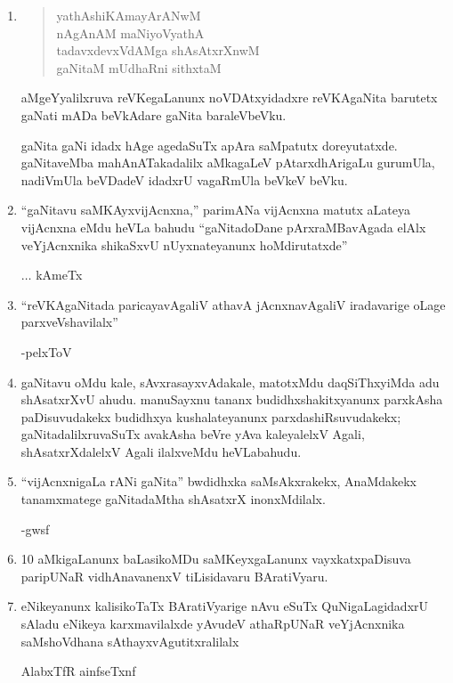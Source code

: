 \begin{enumerate}[\rm 1)]
\item
\begin{center} 
\begin{verse}
yathAshiKAmayArANwM\\
nAgAnAM maNiyoVyathA\\
tadavxdevxVdAMga shAsAtxrXnwM\\
gaNitaM mUdhaRni sithxtaM
\end{verse}
\end{center}
aMgeYyalilxruva reVKegaLanunx noVDAtxyidadxre reVKAgaNita barutetx gaNati mADa beVkAdare gaNita baraleVbeVku.

gaNita gaNi idadx hAge agedaSuTx apAra saMpatutx doreyutatxde. gaNitaveMba mahAnATakadalilx aMkagaLeV pAtarxdhArigaLu gurumUla, nadiVmUla beVDadeV idadxrU vagaRmUla beVkeV beVku.

\item ``gaNitavu saMKAyxvijAcnxna,'' parimANa vijAcnxna matutx aLateya vijAcnxna eMdu heVLa bahudu ``gaNitadoDane pArxraMBavAgada elAlx veYjAcnxnika shikaSxvU nUyxnateyanunx hoMdirutatxde'' 
\begin{flushright}
$\ldots$  kAmeTx
\end{flushright}

\item ``reVKAgaNitada paricayavAgaliV athavA jAcnxnavAgaliV iradavarige oLage parxveVshavilalx''
\begin{flushright}
-pelxToV
\end{flushright}

\item gaNitavu oMdu kale, sAvxrasayxvAdakale, matotxMdu daqSiThxyiMda adu shAsatxrXvU ahudu. manuSayxnu tananx budidhxshakitxyanunx parxkAsha paDisuvudakekx budidhxya kushalateyanunx parxdashiRsuvudakekx; gaNitadalilxruvaSuTx avakAsha beVre yAva kaleyalelxV Agali, shAsatxrXdalelxV Agali ilalxveMdu heVLabahudu.

\item ``vijAcnxnigaLa rANi gaNita'' bwdidhxka saMsAkxrakekx, AnaMdakekx tanamxmatege gaNitadaMtha shAsatxrX inonxMdilalx.
\begin{flushright}
-gwsf
\end{flushright}

\item {\rm 10} aMkigaLanunx baLasikoMDu saMKeyxgaLanunx vayxkatxpaDisuva paripUNaR vidhAnavanenxV tiLisidavaru BAratiVyaru.

\item eNikeyanunx kalisikoTaTx BAratiVyarige nAvu eSuTx QuNigaLagidadxrU sAladu eNikeya karxmavilalxde yAvudeV athaRpUNaR veYjAcnxnika saMshoVdhana sAthayxvAgutitxralilalx
\begin{flushright}
AlabxTfR ainfseTxnf
\end{flushright}


\end{enumerate}
